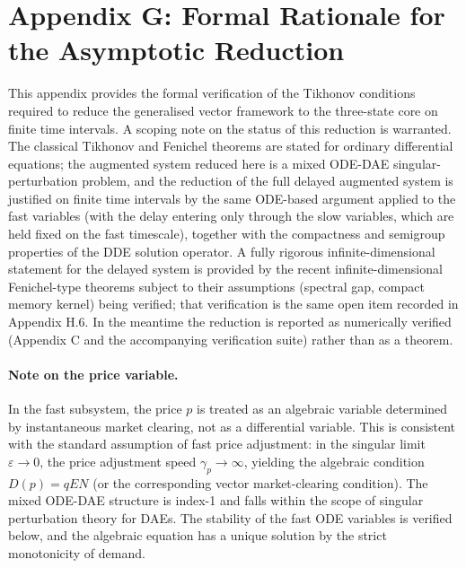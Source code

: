 \documentclass[twocolumn,10pt]{article}
\begin{document}
\begin{table}[h]
\begin{tabular}{lp{5.3cm}}
\bottomrule
\end{tabular}
\end{table}

\section{Appendix G: Formal Rationale for the Asymptotic Reduction}
This appendix provides the formal verification of the Tikhonov conditions required to reduce the generalised vector framework to the three-state core on finite time intervals. A scoping note on the status of this reduction is warranted. The classical Tikhonov and Fenichel theorems \cite{tikhonov1952,fenichel1971,fenichel1979} are stated for ordinary differential equations; the augmented system reduced here is a mixed ODE-DAE singular-perturbation problem, and the reduction of the full delayed augmented system is justified on finite time intervals by the same ODE-based argument applied to the fast variables (with the delay entering only through the slow variables, which are held fixed on the fast timescale), together with the compactness and semigroup properties of the DDE solution operator. A fully rigorous infinite-dimensional statement for the delayed system is provided by the recent infinite-dimensional Fenichel-type theorems \cite{hummelkuehn2022,kuehnsulzbach2024} subject to their assumptions (spectral gap, compact memory kernel) being verified; that verification is the same open item recorded in Appendix H.6. In the meantime the reduction is reported as numerically verified (Appendix C and the accompanying verification suite) rather than as a theorem.

\paragraph{Note on the price variable.}
In the fast subsystem, the price \(p\) is treated as an algebraic variable determined by instantaneous market clearing, not as a differential variable. This is consistent with the standard assumption of fast price adjustment: in the singular limit \(\varepsilon \to 0\), the price adjustment speed \(\gamma_p \to \infty\), yielding the algebraic condition \(D(p) = qEN\) (or the corresponding vector market-clearing condition). The mixed ODE-DAE structure is index-1 and falls within the scope of singular perturbation theory for DAEs. The stability of the fast ODE variables is verified below, and the algebraic equation has a unique solution by the strict monotonicity of demand.
\end{document}
